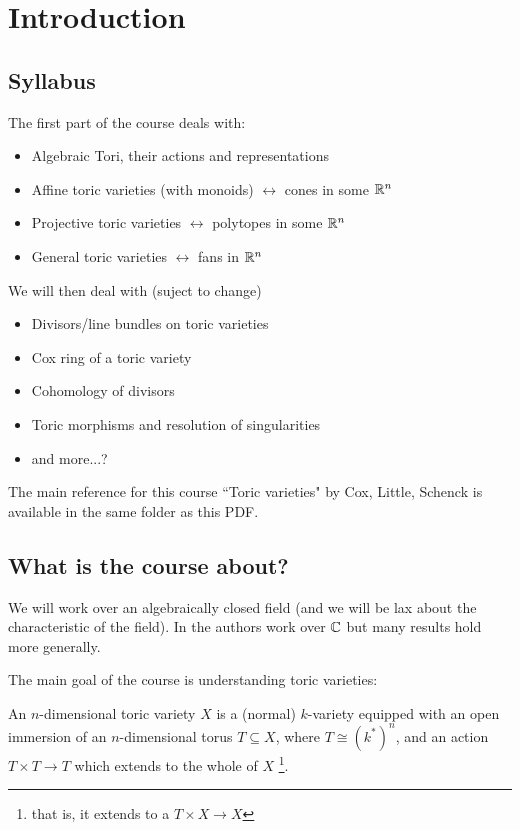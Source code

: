 \chapter*{Introduction}
\section*{Syllabus}
The first part of the course deals with:
\begin{itemize}
    \item Algebraic Tori, their actions and representations
    \item Affine toric varieties (with monoids) $\leftrightarrow$ cones in some $\mathbb{R}^n$
    \item Projective toric varieties $\leftrightarrow$ polytopes in some $\mathbb{R}^n$
    \item General toric varieties $\leftrightarrow$ fans in $\mathbb{R}^n$
\end{itemize}
We will then deal with (suject to change)
\begin{itemize}
    \item Divisors/line bundles on toric varieties
    \item Cox ring of a toric variety
    \item Cohomology of divisors
    \item Toric morphisms and resolution of singularities
    \item and more...?
\end{itemize}
The main reference for this course \textemdash ``Toric varieties" by Cox, Little, Schenck \cite{cox2011toric} \textemdash is available in the same folder as this PDF.

\section*{What is the course about?}
We will work over an algebraically closed field (and we will be lax about the characteristic of the field). In \cite{cox2011toric} the authors work over $\mathbb{C}$ but many results hold more generally.
\medskip

The main goal of the course is understanding toric varieties:
\begin{definition}
An $n$-dimensional toric variety $X$ is a (normal) $k$-variety equipped with an open immersion of an $n$-dimensional torus $T\subseteq X$, where $T\cong (k^\ast)^n$, and an action $T\times T\to T$ which extends to the whole of $X$ \footnote{that is, it extends to a $T\times X\to X$}.
\end{definition}

